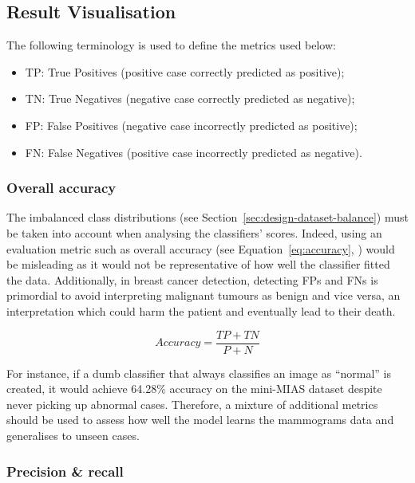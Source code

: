 
\subsection{Result Visualisation}
\label{sec:design-results-visualisation}

The following terminology is used to define the metrics used below:
\begin{itemize}
    \item TP: True Positives (positive case correctly predicted as positive);
    \item TN: True Negatives (negative case correctly predicted as negative);
    \item FP: False Positives (negative case incorrectly predicted as positive);
    \item FN: False Negatives (positive case incorrectly predicted as negative).
\end{itemize}

\subsubsection{Overall accuracy}

The imbalanced class distributions (see Section~\ref{sec:design-dataset-balance}) must be taken into account when analysing the classifiers' scores. Indeed, using an evaluation metric such as overall accuracy (see Equation~\ref{eq:accuracy}, \cite{Falconi2019}) would be misleading as it would not be representative of how well the classifier fitted the data. Additionally, in breast cancer detection, detecting FPs and FNs is primordial to avoid interpreting malignant tumours as benign and vice versa, an interpretation which could harm the patient and eventually lead to their death.

\begin{equation}
\label{eq:accuracy}
    Accuracy = \frac{TP + TN}{P + N}
\end{equation}

For instance, if a dumb classifier that always classifies an image as ``normal'' is created, it would achieve 64.28\% accuracy on the mini-MIAS dataset despite  never picking up abnormal cases. Therefore, a mixture of additional metrics should be used to assess how well the model learns the mammograms data and generalises to unseen cases.

\subsubsection{Precision \& recall}

